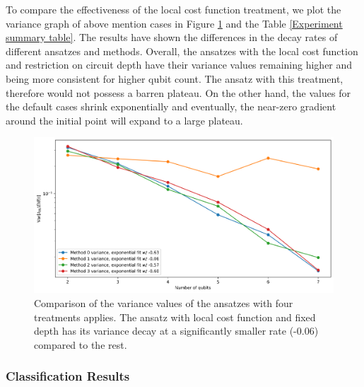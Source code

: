 To compare the effectiveness of the local cost function treatment, we plot the variance graph of above mention cases in Figure \ref{Plot variance default and Local Cost} and the Table \ref{Experiment summary table}.
The results have shown the differences in the decay rates of different ansatzes and methods.
Overall, the ansatzes with the local cost function and restriction on circuit depth have their variance values remaining higher and being more consistent for higher qubit count.
The ansatz with this treatment, therefore would not possess a barren plateau.
On the other hand, the values for the default cases shrink exponentially and eventually, the near-zero gradient around the initial point will expand to a large plateau.



\begin{figure}
    \includegraphics[width=\textwidth]{Artefact/Appendices/variances.png}
    \caption{
        Comparison of the variance values of the ansatzes with four treatments applies.
        The ansatz with local cost function and fixed depth has its variance decay at a significantly smaller rate (-0.06) compared to the rest.
    }
    \label{Plot variance default and Local Cost}
\end{figure}


\subsubsection{Classification Results}